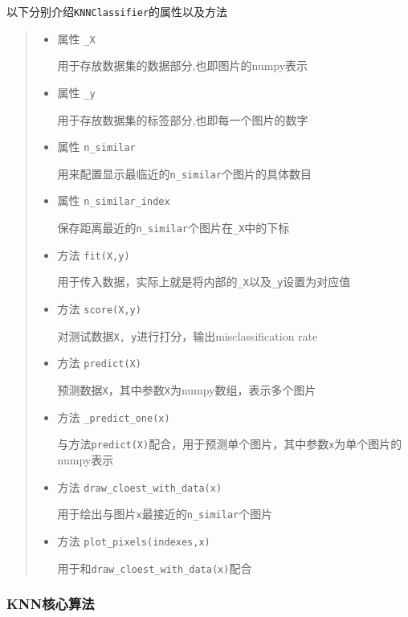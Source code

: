\documentclass[UTF8]{ctexart}
\begin{document}
\vspace*{1mm}


以下分别介绍\lstinline{KNNClassifier}的属性以及方法

\begin{quote}
    \begin{itemize}
        \item 属性 \lstinline{_X}
        
        用于存放数据集的数据部分,也即图片的numpy表示
        \item 属性 \lstinline{_y}
        
        用于存放数据集的标签部分,也即每一个图片的数字
        \item 属性 \lstinline{n_similar}
        
        用来配置显示最临近的\lstinline{n_similar}个图片的具体数目
        \item 属性 \lstinline{n_similar_index}
        
        保存距离最近的\lstinline{n_similar}个图片在\lstinline{_X}中的下标
    
        \item 方法 \lstinline{fit(X,y)}
    
        用于传入数据，实际上就是将内部的\lstinline{_X}以及\lstinline{_y}设置为对应值
        \item 方法 \lstinline{score(X,y)}
    
        对测试数据\lstinline{X, y}进行打分，输出misclassification rate
        \item 方法 \lstinline{predict(X)}
    
        预测数据\lstinline{X}，其中参数\lstinline{X}为numpy数组，表示多个图片
        \item 方法 \lstinline{_predict_one(x)}
    
        与方法\lstinline{predict(X)}配合，用于预测单个图片，其中参数\lstinline{x}为单个图片的numpy表示
        \item 方法 \lstinline{draw_cloest_with_data(x)}
    
        用于绘出与图片\lstinline{x}最接近的\lstinline{n_similar}个图片
        \item 方法 \lstinline{plot_pixels(indexes,x)}
    
        用于和\lstinline{draw_cloest_with_data(x)}配合
    \end{itemize}
\end{quote}


\subsubsection{KNN核心算法}
\end{document}
